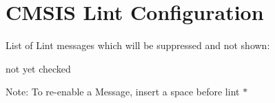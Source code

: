 \hypertarget{group___c_m_s_i_s___lint_cinfiguration}{}\section{C\+M\+S\+IS Lint Configuration}
\label{group___c_m_s_i_s___lint_cinfiguration}
List of Lint messages which will be suppressed and not shown\+:
\begin{DoxyItemize}
\item not yet checked
\end{DoxyItemize}

Note\+: To re-\/enable a Message, insert a space before \textquotesingle{}lint\textquotesingle{} $\ast$ 